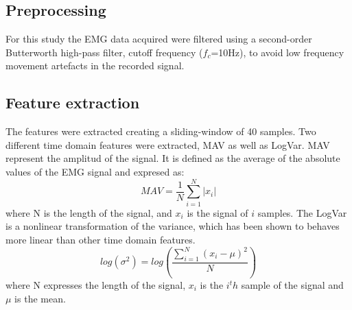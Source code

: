	
	\subsection{Preprocessing}
	For this study the EMG data acquired were filtered using a second-order Butterworth high-pass filter, cutoff frequency ($f_c$=10Hz), to avoid low frequency movement artefacts in the recorded signal.\\
	
	\subsection{Feature extraction}
	The features were extracted creating a sliding-window of 40 samples. %
	Two different time domain features were extracted, MAV as well as LogVar. MAV represent the amplitud of the signal. It is defined as the average of the absolute values of the EMG signal and expresed as:
	\begin{equation}
	MAV = \frac{1}{N}\sum\limits_{i=1}^N|x_i|
	\end{equation}
	where N is the length of the signal, and $x_i$ is the signal of $i$ samples.
	The LogVar is a nonlinear transformation of the variance, which has been shown to behaves more linear than other time domain features. \cite{hanhe2014}
	\begin{equation} \label{eq:logvar}
	log(\sigma^2) = log(\frac{\sum\limits_{i=1}^N(x_i - \mu)^2}{N})
	\end{equation}
	where N expresses the length of the signal, $x_i$ is the $i^th$ sample of the signal and $\mu$ is the mean.
